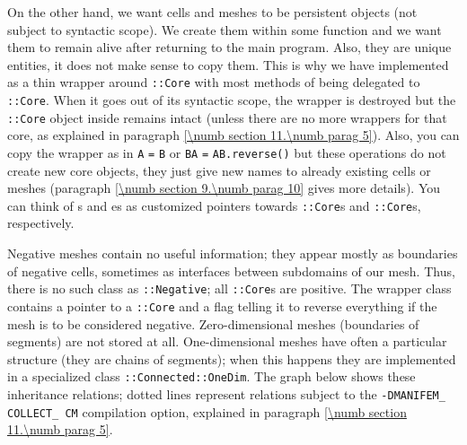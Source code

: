 On the other hand, we want cells and meshes to be persistent objects (not subject to
syntactic scope).
We create them within some function and we want them to remain alive after returning
to the main program.
Also, they are unique entities, it does not make sense to copy them.
This is why we have implemented {\small\tt{}} as a thin wrapper around
{\small\tt{}::Core}
with most methods of {\small\tt{}} being delegated to {\small\tt{}::Core}.
When it goes out of its syntactic scope, the wrapper is destroyed but the {\small\tt{}::Core}
object inside remains intact (unless there are no more wrappers for that core, as explained in
paragraph \ref{\numb section 11.\numb parag 5}).
Also, you can copy the wrapper as in {\small\tt{}} {\small\tt A} {\small\tt =}
{\small\tt B} or {\small\tt{}} {\small\tt BA} {\small\tt =} {\small\tt AB.reverse()}
but these operations do not create new core objects, they just give new names to
already existing cells or meshes (paragraph \ref{\numb section 9.\numb parag 10} gives
more details).
You can think of {\small\tt{}}s and {\small\tt{}}es as customized pointers towards
{\small\tt{}::Core}s and {\small\tt{}::Core}s, respectively.

Negative meshes contain no useful information; they appear mostly as boundaries
of negative cells, sometimes as interfaces between subdomains of our mesh.
Thus, there is no such class as {\small\tt{}::Negative};
all {\small\tt{}::Core}s are positive.
The wrapper class {\small\tt{}} contains a pointer to a {\small\tt{}::Core}
and a flag telling it to reverse everything if the mesh is to be considered negative.
Zero-dimensional meshes (boundaries of segments) are not stored at all.
One-dimensional meshes have often a particular structure (they are chains of segments);
when this happens they are implemented in a specialized class
{\small\tt{}::Connected::OneDim}.
The graph below shows these inheritance relations; dotted lines represent relations subject to
the {\small\tt -DMANIFEM\_\,COLLECT\_\,CM} compilation option, explained in paragraph
\ref{\numb section 11.\numb parag 5}.

